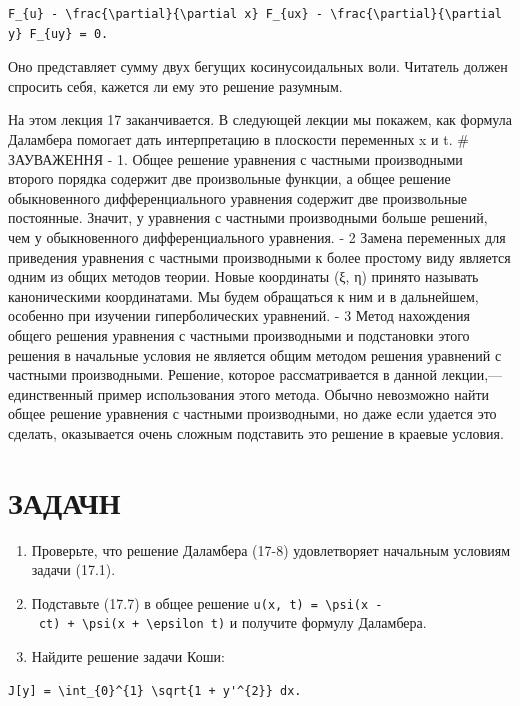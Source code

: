 \documentclass[
  ukrainian,
]{article}
\begin{document}
\begin{verbatim}
F_{u} - \frac{\partial}{\partial x} F_{ux} - \frac{\partial}{\partial y} F_{uy} = 0.
\end{verbatim}

Оно представляет сумму двух бегущих косинусоидальных воли. Читатель
должен спросить себя, кажется ли ему это решение разумным.

На этом лекция 17 заканчивается. В следующей лекции мы покажем, как
формула Даламбера помогает дать интерпретацию в плоскости переменных x и
t. \# ЗАУВАЖЕННЯ - 1. Общее решение уравнения с частными производными
второго порядка содержит две произвольные функции, а общее решение
обыкновенного дифференциального уравнения содержит две произвольные
постоянные. Значит, у уравнения с частными производными больше решений,
чем у обыкновенного дифференциального уравнения. - 2 Замена переменных
для приведения уравнения с частными производными к более простому виду
является одним из общих методов теории. Новые координаты (ξ, η) принято
называть каноническими координатами. Мы будем обращаться к ним и в
дальнейшем, особенно при изучении гиперболических уравнений. - 3 Метод
нахождения общего решения уравнения с частными производными и
подстановки этого решения в начальные условия не является общим методом
решения уравнений с частными производными. Решение, которое
рассматривается в данной лекции,--- единственный пример использования
этого метода. Обычно невозможно найти общее решение уравнения с частными
производными, но даже если удается это сделать, оказывается очень
сложным подставить это решение в краевые условия.

\section{ЗАДАЧН}\label{ux437ux430ux434ux430ux447ux43d}

\begin{enumerate}
\def\labelenumi{\arabic{enumi}.}
\item
  Проверьте, что решение Даламбера (17-8) удовлетворяет начальным
  условиям задачи (17.1).
\item
  Подставьте (17.7) в общее решение
  \texttt{u(x,\ t)\ =\ \textbackslash{}psi(x\ -\ ct)\ +\ \textbackslash{}psi(x\ +\ \textbackslash{}epsilon\ t)}
  и получите формулу Даламбера.
\item
  Найдите решение задачи Коши:
\end{enumerate}

\begin{verbatim}
J[y] = \int_{0}^{1} \sqrt{1 + y'^{2}} dx.
\end{verbatim}
\end{document}
